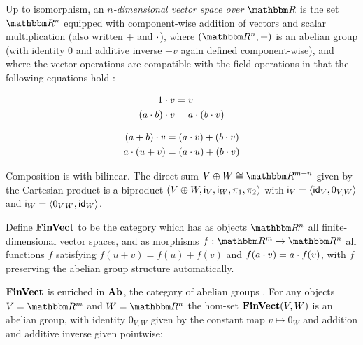 \begin{definition}
Up to isomorphism, an \emph{$n$-dimensional vector space over $\RR$} is the set $\RR^n$ equipped with
component-wise addition of vectors and scalar multiplication (also written $+$ and $\cdot$), where $(\RR^n,+)$
is an abelian group (with identity $0$ and additive inverse $-v$ again defined component-wise), and where the
vector operations are compatible with the field operations in that the following equations hold :

\vspace{-4mm}
\begin{minipage}[t]{0.45\textwidth}
\begin{center}
\begin{align*}
   1 \cdot v &= v \\
   (a \cdot b) \cdot v &= a \cdot (b \cdot v)
\end{align*}
\end{center}
\end{minipage}%
\begin{minipage}[t]{0.45\textwidth}
\begin{center}
\begin{align*}
   (a + b) \cdot v &= (a \cdot v) + (b \cdot v) \\
   a \cdot (u + v) &= (a \cdot u) + (b \cdot v)
\end{align*}
\end{center}
\end{minipage}
\end{definition}

\vspace{1mm}
\noindent Composition is with bilinear. The direct sum $V \biprod W \iso \RR^{m + n}$ given by the Cartesian
product is a biproduct $(V \oplus W, \mathsf{i}_{V}, \mathsf{i}_{W}, \pi_1, \pi_2)$ with $\mathsf{i}_{V} =
\langle \mathsf{id}_{V}, 0_{V,W}\rangle$ and $\mathsf{i}_{W} = \langle 0_{V,W}, \mathsf{id}_{W}\rangle$.

\begin{definition}
Define $\mathbf{FinVect}$ to be the category which has as objects $\RR^n$ all finite-dimensional vector spaces, and as
morphisms $f: \RR^m \to \RR^n$ all functions $f$ satisfying $f(u + v) = f(u) + f(v)$ and $f(a \cdot v) = a
\cdot f(v)$, with $f$ preserving the abelian group structure automatically.
\end{definition}

$\mathbf{FinVect}$ is enriched in $\mathbf{Ab}$, the category of abelian groups . For any objects $V = \RR^m$ and $W = \RR^n$ the hom-set
$\mathbf{FinVect}(V,W)$ is an abelian group, with identity $0_{V,W}$ given by the constant map $v \mapsto 0_W$ and
addition and additive inverse given pointwise:

